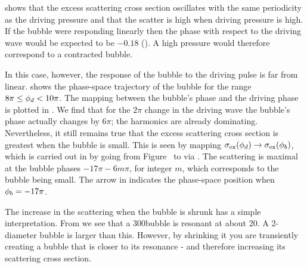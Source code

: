  shows that the excess scattering cross section oscillates with the same periodicity
as the driving pressure
and that the scatter is high when driving pressure is high.
If the bubble were responding linearly
then the phase with respect to the driving wave would be expected to be $-0.18$ ().
A high pressure would therefore correspond to a contracted bubble.

In this case, however, the response of the bubble to the driving pulse is far from linear.
 shows the phase-space trajectory of the bubble for the range $8\pi\le{\phi_d}<10\pi$.
The mapping between the bubble's phase and the driving phase is plotted in .
We find that for the $2\pi$ change in the driving wave the bubble's phase actually changes by $6\pi$;
the harmonics are already dominating.
Nevertheless, it still remains true that the excess scattering cross section is  greatest when the bubble is small.
This is seen by mapping  $\sigma_\textrm{ex}({\phi_d}) \rightarrow \sigma_\textrm{ex}({\phi_b})$,
which is carried out in by going from Figure~ to 
via .
The scattering is maximal at the bubble phases $-17\pi - 6m\pi$, for integer $m$, which corresponds to the bubble being small.
The arrow in  indicates the phase-space position when ${\phi_b} = -17\pi$.

The increase in the scattering when the bubble is shrunk has a simple interpretation.
From  we see that a \unit{300}\nano\metre bubble is resonant at about \unit{20}\mega\hertz.
A \unit{2}\micro\metre-diameter bubble is larger than this.
However, by shrinking it you are transiently creating a bubble that is closer to its resonance - and therefore increasing its scattering cross section.



